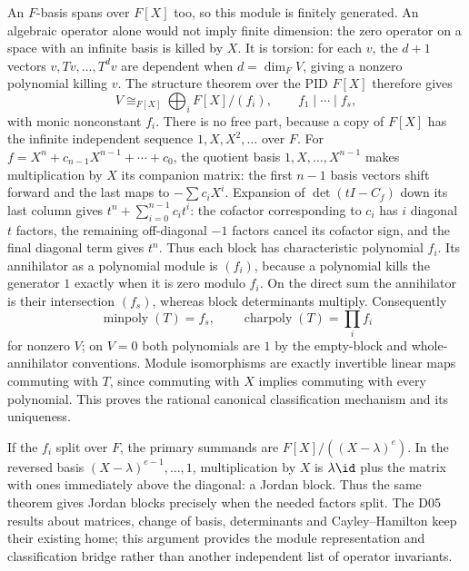 An $F$-basis spans over $F[X]$ too, so this module is finitely generated.
An algebraic operator alone would not imply finite dimension: the zero
operator on a space with an infinite basis is killed by $X$.
It is torsion: for each $v$, the $d+1$ vectors
$v,Tv,\ldots,T^d v$ are dependent when $d=\dim_F V$, giving a
nonzero polynomial killing $v$. The structure theorem over the PID
$F[X]$ therefore gives
\[
 V\cong_{F[X]}\bigoplus_i F[X]/(f_i),\qquad
 f_1\mid\cdots\mid f_s,
\]
with monic nonconstant $f_i$. There is no free part, because a copy of
$F[X]$ has the infinite independent sequence $1,X,X^2,\ldots$ over $F$.
For $f=X^n+c_{n-1}X^{n-1}+\cdots+c_0$, the quotient basis
$1,X,\ldots,X^{n-1}$ makes multiplication by $X$ its companion matrix:
the first $n-1$ basis vectors shift forward and the last maps to
$-\sum c_iX^i$. Expansion of $\det(tI-C_f)$ down its last column gives
$t^n+\sum_{i=0}^{n-1}c_i t^i$: the cofactor corresponding to $c_i$
has $i$ diagonal $t$ factors, the remaining off-diagonal $-1$ factors
cancel its cofactor sign, and the final diagonal term gives $t^n$.
Thus each block has characteristic polynomial $f_i$.
Its annihilator as a polynomial module is $(f_i)$, because a polynomial
kills the generator $1$ exactly when it is zero modulo $f_i$.
On the direct sum the annihilator is their intersection
$(f_s)$, whereas block determinants multiply. Consequently
\[
 \operatorname{minpoly}(T)=f_s,\qquad
 \operatorname{charpoly}(T)=\prod_i f_i
\]
for nonzero $V$; on $V=0$ both polynomials are $1$ by the empty-block
and whole-annihilator conventions. Module isomorphisms are exactly
invertible linear maps commuting with $T$, since commuting with $X$
implies commuting with every polynomial. This proves the rational
canonical classification mechanism and its uniqueness.

If the $f_i$ split over $F$, the primary summands are
$F[X]/((X-\lambda)^e)$. In the reversed basis
$(X-\lambda)^{e-1},\ldots,1$, multiplication by $X$ is $\lambda\id$
plus the matrix with ones immediately above the diagonal: a Jordan
block. Thus the same theorem gives Jordan blocks precisely when the
needed factors split. The D05 results about matrices, change of basis,
determinants and Cayley--Hamilton keep their existing home; this argument
provides the module representation and classification bridge rather
than another independent list of operator invariants.
